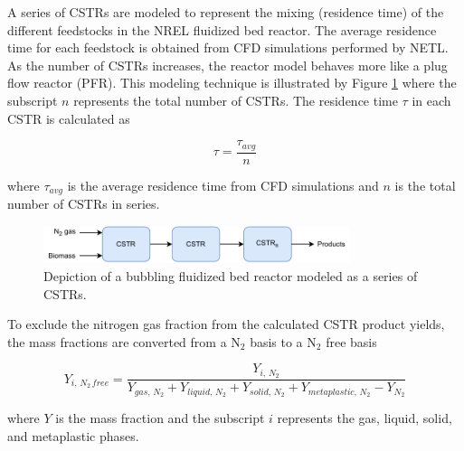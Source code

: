 A series of CSTRs are modeled to represent the mixing (residence time) of the different feedstocks in the NREL fluidized bed reactor. The average residence time for each feedstock is obtained from CFD simulations performed by NETL. As the number of CSTRs increases, the reactor model behaves more like a plug flow reactor (PFR). This modeling technique is illustrated by Figure \ref{fig:reactor-cstr-series} where the subscript $n$ represents the total number of CSTRs. The residence time $\tau$ in each CSTR is calculated as

\begin{equation}
    \tau = \frac{\tau_{avg}}{n}
\end{equation}

\noindent where $\tau_{avg}$ is the average residence time from CFD simulations and $n$ is the total number of CSTRs in series.

\begin{figure}[H]
    \centering
    \includegraphics[width=0.8\textwidth]{figures/reactor-cstr-series.pdf}
    \caption{Depiction of a bubbling fluidized bed reactor modeled as a series of CSTRs.}
    \label{fig:reactor-cstr-series}
\end{figure}

To exclude the nitrogen gas fraction from the calculated CSTR product yields, the mass fractions are converted from a N$_2$ basis to a N$_2$ free basis

\begin{equation}
    Y_{i,\,N_2\,free} = \frac{Y_{i,\,N_2}}{Y_{gas,\,N_2} + Y_{liquid,\,N_2} + Y_{solid,\,N_2} + Y_{metaplastic,\,N_2} - Y_{N_2}}
\end{equation}

\noindent where $Y$ is the mass fraction and the subscript $i$ represents the gas, liquid, solid, and metaplastic phases.
